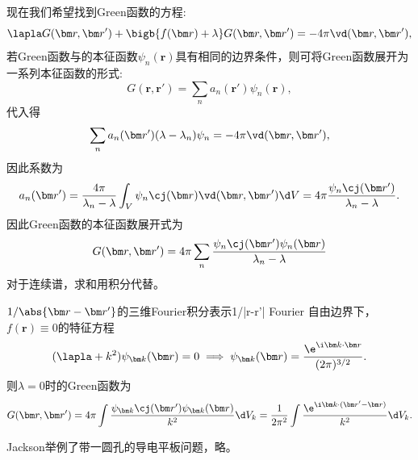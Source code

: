 现在我们希望找到Green函数的方程:
\begin{equation}
    \lapla G(\bm r,\bm r')+\bigb{f(\bm r)+\lambda}G(\bm r,\bm r')=-4\pi\vd(\bm r,\bm r'),
\end{equation}
若Green函数与的本征函数$\psi_n(\bm r)$具有相同的边界条件，则可将Green函数展开为一系列本征函数的形式:
\[
    G(\bm r,\bm r')=\sum_n a_n(\bm r')\psi_n(\bm r),
\]
代入得
\[
    \sum_n a_n(\bm r')(\lambda-\lambda_n)\psi_n=-4\pi\vd(\bm r,\bm r'),
\]
因此系数为
\[
    a_n(\bm r')=\frac{4\pi}{\lambda_n-\lambda}\int_V\psi_n\cj(\bm r)\vd(\bm r,\bm r')\d V=4\pi\frac{\psi_n\cj(\bm r')}{\lambda_n-\lambda}.
\]
因此Green函数的本征函数展开式为
\begin{equation}
    G(\bm r,\bm r')=4\pi\sum_n \frac{\psi_n\cj(\bm r')\psi_n(\bm r)}{\lambda_n-\lambda}
\end{equation}
对于连续谱，求和用积分代替。
\begin{example}{$1/\abs{\bm r-\bm r'}$的三维Fourier积分表示}{1/|r-r'| Fourier}
    自由边界下，$f(\bm r)\equiv 0$的特征方程
    \[
        (\lapla+k^2)\psi_{\bm k}(\bm r)=0\implies\psi_{\bm k}(\bm r)=\frac{\e^{\i\bm k\cdot\bm r}}{(2\pi)^{3/2}}.
    \]
    则$\lambda=0$时的Green函数为
    \[
        G(\bm r,\bm r')=4\pi\int\frac{\psi_{\bm k}\cj(\bm r')\psi_{\bm k}(\bm r)}{k^2}\d V_k=\frac1{2\pi^2}\int\frac{\e^{\i\bm k\cdot(\bm r'-\bm r)}}{k^2}\d V_k.
    \]
\end{example}

\label{sec:mixed boundary condition}

Jackson举例了带一圆孔的导电平板问题，略。

